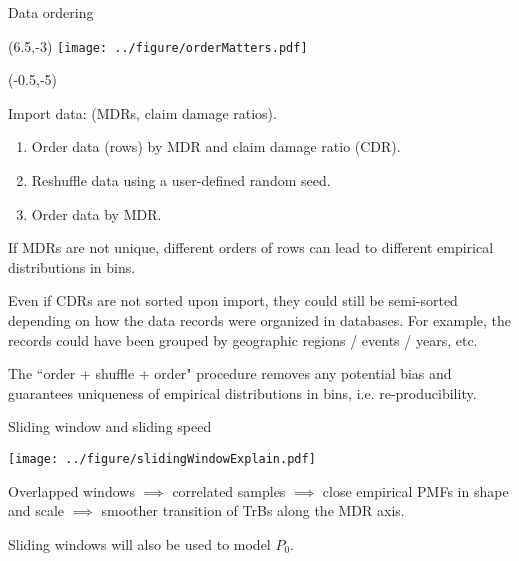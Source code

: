 \documentclass[aspectratio=169]{beamer}
\begin{document}
\begin{frame}{Data ordering}

\begin{textblock}{1}(6.5,-3)
\texttt{[image: ../figure/orderMatters.pdf]}
\end{textblock}


\begin{textblock}{6.5}(-0.5,-5)

\scriptsize Import data: (MDRs, claim damage ratios).\medskip

\begin{enumerate}
\item Order data (rows) by MDR and claim damage ratio (CDR).\medskip

\item Reshuffle data using a user-defined random seed.\medskip

\item Order data by MDR.\medskip
\end{enumerate}

If MDRs are not unique, different orders of rows can lead to different empirical distributions in bins.\medskip\pause

Even if CDRs are not sorted upon import, they could still be semi-sorted depending on how the data records were organized in databases. For example, the records could have been grouped by geographic regions / events / years, etc. \medskip\pause

The ``order + shuffle + order" procedure removes any potential bias and guarantees uniqueness of empirical distributions in bins, i.e. re-producibility. 

\end{textblock}


\end{frame}


\begin{frame}{Sliding window and sliding speed}
\begin{center}
\texttt{[image: ../figure/slidingWindowExplain.pdf]}
\end{center}
Overlapped windows $\implies$ correlated samples $\implies$ close empirical PMFs in shape and scale $\implies$ smoother transition of TrBs along the MDR axis.\medskip

Sliding windows will also be used to model $P_0$.
\end{frame}
\end{document}
